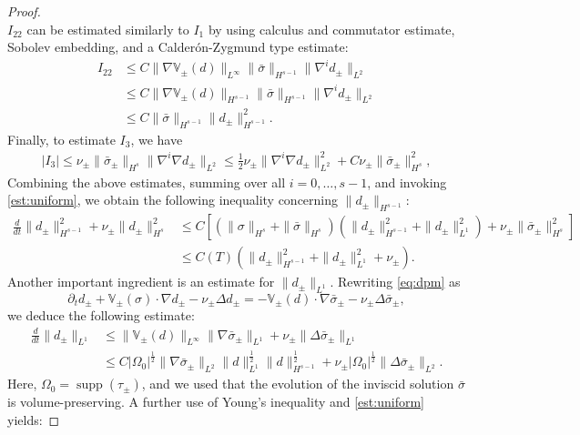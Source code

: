 \documentclass[11pt,reqno]{amsproc}
\newcommand{\na}{\nabla}
\newcommand{\V}{\mathbb{V}}
\newcommand{\p}{\partial}
\newcommand{\pt}{\p_t}
\DeclareMathOperator{\supp}{supp}
\begin{document}
\begin{proof}
$$    $$
    $I_{22}$ can be estimated similarly to $I_1$ by using calculus and commutator estimate, Sobolev embedding, and a Calder\'on-Zygmund type estimate:
    \begin{align*}
    I_{22} &\le C\|\na \V_\pm(d)\|_{L^\infty} \|\bar\sigma\|_{H^{s-1}} \|\na^i d_\pm\|_{L^2}\\
    &\le C\|\na \V_\pm(d)\|_{H^{s-1}}\|\bar\sigma\|_{H^{s-1}}\|\na^i d_\pm\|_{L^2}\\
    &\le C\|\bar\sigma\|_{H^{s-1}}\|d_\pm\|_{H^{s-1}}^2.
    \end{align*}
    Finally, to estimate $I_3$, we have
    \begin{align*}
        |I_3| \le \nu_\pm \|\bar\sigma_\pm\|_{H^s} \|\na^{i}\na d_\pm\|_{L^2} \le \frac12 \nu_\pm \|\na^{i}\na d_\pm\|_{L^2}^2 + C\nu_\pm \|\bar\sigma_\pm\|_{H^s}^2,
    \end{align*}
    Combining the above estimates, summing over all $i = 0,\hdots, s-1$, and invoking \eqref{est:uniform}, we obtain the following inequality concerning $\|d_\pm\|_{H^{s-1}}$:
    \begin{equation}\label{est:dHs-1}
    \begin{aligned}
        \frac{d}{dt} \|d_\pm\|_{H^{s-1}}^2 + \nu_\pm \|d_\pm\|_{H^{s}}^2 &\le C\left[\left(\|\sigma\|_{H^s} + \|\bar\sigma\|_{H^s}\right) (\|d_\pm\|_{H^{s-1}}^2 + \|d_\pm\|_{L^1}^2)+ \nu_\pm \|\bar\sigma_\pm\|_{H^s}^2\right]\\
        &\le C(T) (\|d_\pm\|_{H^{s-1}}^2+ \|d_\pm\|_{L^1}^2+ \nu_\pm).
    \end{aligned}
    \end{equation}
    Another important ingredient is an estimate for $\|d_\pm\|_{L^1}$. Rewriting \eqref{eq:dpm} as
    $$
    \pt d_\pm + \V_\pm(\sigma) \cdot \nabla d_\pm - \nu_\pm \Delta d_\pm = - \V_\pm (d) \cdot \na \bar\sigma_\pm - \nu_\pm \Delta \bar\sigma_\pm,
    $$
    we deduce the following estimate:
    \begin{align*}
    \frac{d}{dt}\|d_\pm\|_{L^1} &\le \|\V_\pm (d)\|_{L^\infty}\|\na \bar\sigma_\pm\|_{L^1} + \nu_\pm \|\Delta \bar\sigma_\pm\|_{L^1}\\
    &\le C|\Omega_0|^\frac12\|\na \bar\sigma_\pm\|_{L^2} \|d\|_{L^1}^{\frac12}\|d\|_{H^{s-1}}^\frac12 + \nu_\pm |\Omega_0|^\frac12 \|\Delta\bar\sigma_\pm\|_{L^2}.
    \end{align*}
    Here, $\Omega_0 = \supp(\tau_\pm)$, and we used that the evolution of the inviscid solution $\bar\sigma$ is volume-preserving. A further use of Young's inequality and \eqref{est:uniform} yields:

\end{proof}
\end{document}

